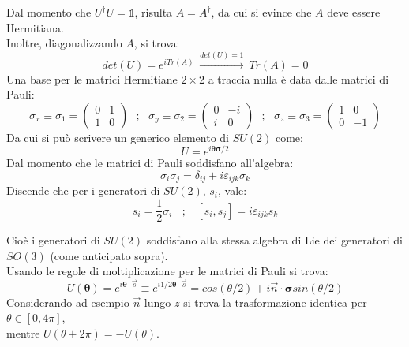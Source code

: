\documentclass[twoside]{article}
\begin{document}
Dal momento che $U^{\dagger}U=\mathds{1}$, risulta $A=A^{\dagger}$, da cui si evince che $A$ deve essere Hermitiana.
\\
Inoltre, diagonalizzando $A$, si trova:
\begin{equation}
    det(U)=e^{iTr(A)} \ \xrightarrow{det(U)=1} \ Tr(A)=0
\end{equation}
Una base per le matrici Hermitiane $2\times 2$ a traccia nulla è data dalle matrici di Pauli:
\begin{equation}
    \sigma_x\equiv \sigma_1=\begin{pmatrix}
    0 & 1 \\ 1 & 0
    \end{pmatrix} \ \ \ ; \ \ \ \sigma_y\equiv \sigma_2=\begin{pmatrix}
    0 & -i \\ i & 0
    \end{pmatrix} \ \ \ ; \ \ \ \sigma_z\equiv \sigma_3=\begin{pmatrix}
    1 & 0 \\ 0 & -1
    \end{pmatrix}
\end{equation}
Da cui si può scrivere un generico elemento di $SU(2)$ come:
\begin{equation}
    U=e^{i\bm{\theta}\bm{\sigma}/2}
\end{equation}
Dal momento che le matrici di Pauli soddisfano all'algebra:
\begin{equation}
    \sigma_i \sigma_j=\delta_{ij}+i \varepsilon_{ijk}\sigma_k
\end{equation}
Discende che per i generatori di $SU(2)$, $s_i$, vale:
\begin{equation}
    s_i=\frac{1}{2}\sigma_i \ \ \ \ ; \ \ \ \ [s_i,s_j]=i \varepsilon_{ijk}s_k
\end{equation}

Cioè i generatori di $SU(2)$ soddisfano alla stessa algebra di Lie dei generatori di $SO(3)$ (come anticipato sopra).
\\
Usando le regole di moltiplicazione per le matrici di Pauli si trova:
\begin{equation}
    U(\bm{\theta})=e^{i\bm{\theta}\cdot \Vec{s}}\equiv e^{i 1/2 \bm{\theta}\cdot \Vec{s}}=cos(\theta/2)+i \Vec{n}\cdot \bm{\sigma}sin(\theta/2)
\end{equation}
Considerando ad esempio $\Vec{n}$ lungo $z$ si trova la trasformazione identica per $\theta \in [0,4\pi]$, \\ mentre $U(\theta+2\pi)=-U(\theta)$.
\end{document}
